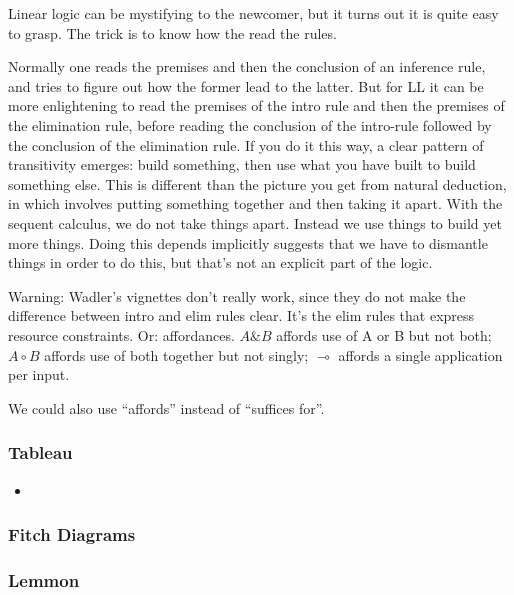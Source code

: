 \documentclass{article}
\begin{document}
Linear logic can be mystifying to the newcomer, but it turns out it is
quite easy to grasp. The trick is to know how the read the rules.

Normally one reads the premises and then the conclusion of an
inference rule, and tries to figure out how the former lead to the
latter. But for LL it can be more enlightening to read the premises of
the intro rule and then the premises of the elimination rule, before
reading the conclusion of the intro-rule followed by the conclusion of
the elimination rule. If you do it this way, a clear pattern of
transitivity emerges: build something, then use what you have built to
build something else. This is different than the picture you get from
natural deduction, in which involves putting something together and
then taking it apart. With the sequent calculus, we do not take things
apart. Instead we use things to build yet more things. Doing this
depends implicitly suggests that we have to dismantle things in order
to do this, but that's not an explicit part of the logic.

Warning: Wadler's vignettes don't really work, since they do not make
the difference between intro and elim rules clear. It's the elim rules
that express resource constraints. Or: affordances. \(A\&B\) affords
use of A or B but not both; \(A\circ B\) affords use of both together
but not singly; \(\multimap\) affords a single application per input.

We could also use ``affords'' instead of ``suffices for''.

\subsubsection{Tableau}

\begin{itemize}

\item {} \cite{Smullyan1968-SMUFL}

\end{itemize}

\subsubsection{Fitch Diagrams}

 \cite{Fitch1952-FITSL}

\subsubsection{Lemmon}
\end{document}
